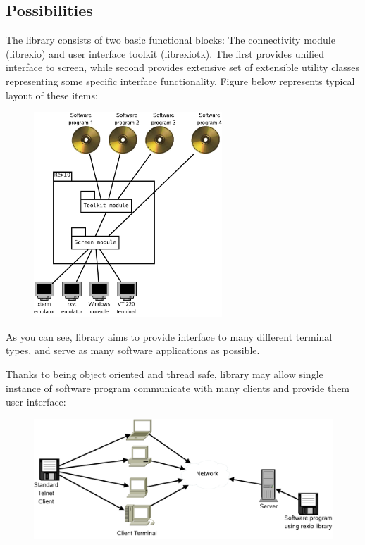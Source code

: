 \subsection {Possibilities}
  The library consists of two basic functional blocks: The connectivity
  module (librexio) and user interface toolkit (librexiotk). The first
  provides unified interface to screen, while second provides
  extensive set of extensible
  utility classes representing some specific interface
  functionality. Figure below represents typical layout of these items:

  \begin{figure}[H]
  \begin{center}
  \leavevmode\includegraphics[width=200pt]{graphics/PurposeOfLibrary}
  \end{center}
  \end{figure}

  As you can see, library aims to provide interface to many different
  terminal types, and serve as many software applications as possible.


  Thanks to being object oriented and thread safe, library may allow
  single instance of software program communicate with many clients
  and provide them user interface:

  \begin{figure}[H]
  \begin{center}
  \leavevmode\includegraphics[width=350pt]{graphics/IdeaOfMUD}
  \end{center}
  \end{figure}

